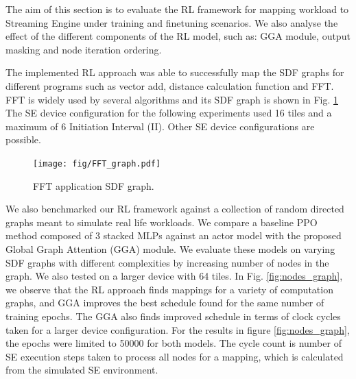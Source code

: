 
The aim of this section is to evaluate the RL framework for mapping workload to Streaming Engine under training and finetuning scenarios. 
We also analyse the effect of the different components of the RL model, such as: GGA module, output masking and node iteration ordering.

The implemented RL approach was able to successfully map the SDF graphs for different programs such as vector add, distance calculation function and FFT. 
FFT is widely used by several algorithms and its SDF graph is shown in Fig. \ref{fig:FFT_graph} 
The SE device configuration for the following experiments used 16 tiles and a maximum of 6 Initiation Interval (II).
Other SE device configurations are possible.

\begin{figure}[h]
  \centering
  \texttt{[image: fig/FFT\_graph.pdf]}
  \caption{FFT application SDF graph.}
  \label{fig:FFT_graph}
\end{figure}


We also benchmarked our RL framework against a collection of random directed graphs meant to simulate real life workloads. 
We compare a baseline PPO method composed of 3 stacked MLPs against an actor model with the proposed Global Graph Attention (GGA) module.
We evaluate these models on varying SDF graphs with different complexities by increasing number of nodes in the graph. 
We also tested on a larger device with 64 tiles.
In Fig. \ref{fig:nodes_graph}, we observe that the RL approach finds mappings for a variety of computation graphs, and GGA
improves the best schedule found for the same number of training epochs. The GGA also finds improved schedule in terms of clock cycles taken for a larger device configuration. 
For the results in figure \ref{fig:nodes_graph}, the epochs were limited to 50000 for both models. 
The cycle count is number of SE execution steps taken to process all nodes for a mapping, which is calculated from the simulated SE environment. 

